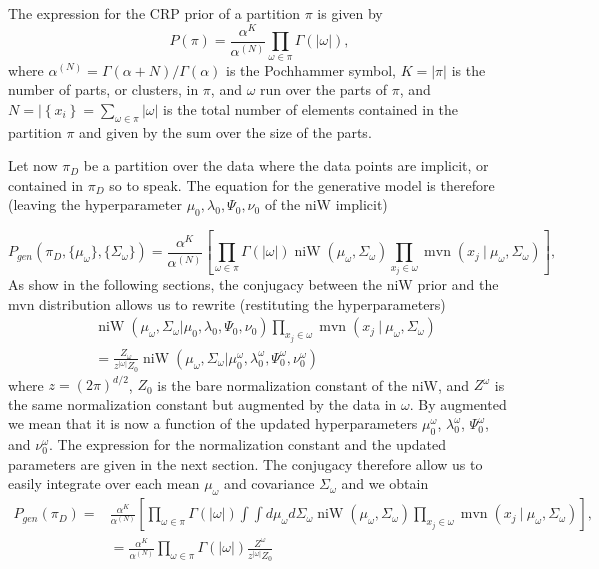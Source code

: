 \documentclass[11pt, oneside]{article}   	%
\DeclareMathOperator{\niW}{niW}
\DeclareMathOperator{\mvn}{mvn}
\begin{document}
The expression for the CRP prior of a partition $\pi$ is given by
$$P(\pi) = \frac{\alpha^K}{\alpha^{(N)}}\prod_{\omega\in\pi} \Gamma(\vert\omega\vert),$$
where $\alpha^{(N)}= \Gamma(\alpha + N)/\Gamma(\alpha)$ is the Pochhammer symbol, $K=\vert\pi\vert$ is the number of parts, or clusters, in $\pi$, and $\omega$ run over the parts of $\pi$, and $N = \vert\left\lbrace x_i\right\rbrace = \sum_{\omega\in\pi}\vert\omega\vert$ is the total number of elements contained in the partition $\pi$ and given by the sum over the size of the parts.

Let now $\pi_D$ be a partition over the data where the data points are implicit, or contained in $\pi_D$ so to speak. The equation for the generative model is therefore (leaving the hyperparameter $\mu_0, \lambda_0, \Psi_0, \nu_0$ of the niW implicit)

\begin{equation}
P_{gen}(\pi_D, \lbrace\mu_\omega\rbrace, \lbrace\Sigma_\omega\rbrace)
= \frac{\alpha^K}{\alpha^{(N)}}\left[\prod_{\omega\in\pi}\Gamma(\vert\omega\vert)\niW(\mu_\omega,\Sigma_\omega)\prod_{x_j\in\omega} \mvn(x_j~\vert~\mu_\omega,\Sigma_\omega)\right],
\end{equation}
As show in the following sections, the conjugacy between the niW prior and the mvn distribution allows us to rewrite (restituting the hyperparameters)
\begin{equation}\begin{split}
&\niW(\mu_\omega,\Sigma_\omega\vert\mu_0,\lambda_0, \Psi_0, \nu_0)\prod_{x_j\in\omega} \mvn(x_j~\vert~\mu_\omega,\Sigma_\omega)\\
&= \frac{Z_\omega}{z^{\vert\omega\vert} Z_0} \niW(\mu_\omega, \Sigma_\omega\vert \mu_0^\omega, \lambda_0^\omega, \Psi_0^\omega, \nu_0^\omega)
\end{split}\end{equation}
where $z = (2\pi)^{d/2}$, $Z_0$ is the bare normalization constant of the niW, and $Z^\omega$ is the same normalization constant but augmented by the data in $\omega$. By augmented we mean that it is now a function of the updated hyperparameters $\mu_0^\omega$, $\lambda_0^\omega$, $\Psi_0^\omega$, and $\nu_0^\omega$. The expression for the normalization constant and the updated parameters are given in the next section. The conjugacy therefore allow us to easily integrate over each mean $\mu_\omega$ and covariance $\Sigma_\omega$ and we obtain
\begin{equation}\begin{split}
P_{gen}(\pi_D) =& \frac{\alpha^K}{\alpha^{(N)}}\left[\prod_{\omega\in\pi}\Gamma(\vert\omega\vert)\int\int d\mu_\omega d\Sigma_\omega \niW(\mu_\omega,\Sigma_\omega)\prod_{x_j\in\omega} \mvn(x_j~\vert~\mu_\omega,\Sigma_\omega)\right],\\
&= \frac{\alpha^K}{\alpha^{(N)}}\prod_{\omega\in\pi}\Gamma(\vert\omega\vert) \frac{Z^\omega}{z^{\vert\omega\vert} Z_0}
\end{split}\end{equation}
\end{document}

